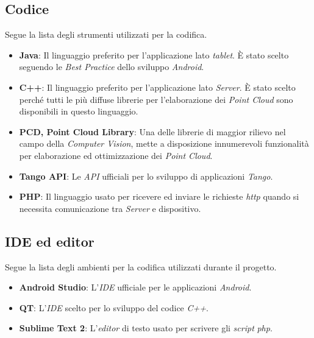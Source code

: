 \subsection{Codice}
Segue la lista degli strumenti utilizzati per la codifica.
\begin{itemize}
	\item \textbf{Java}: Il linguaggio preferito per l'applicazione lato \emph{tablet}. È stato scelto seguendo le \emph{Best Practice} dello sviluppo \emph{Android}.
	\item \textbf{C++}: Il linguaggio preferito per l'applicazione lato \emph{Server}. È stato scelto perché tutti le più diffuse librerie per l'elaborazione dei \emph{Point Cloud} sono disponibili in questo linguaggio.
	\item \textbf{PCD, Point Cloud Library}: Una delle librerie di maggior rilievo nel campo della \emph{Computer Vision}, mette a disposizione innumerevoli funzionalità per elaborazione ed ottimizzazione dei \emph{Point Cloud}.
	\item \textbf{Tango API}: Le \emph{API} ufficiali per lo sviluppo di applicazioni \emph{Tango}.
	\item \textbf{PHP}: Il linguaggio usato per ricevere ed inviare le richieste \emph{http} quando si necessita comunicazione tra \emph{Server} e dispositivo.
\end{itemize}

\subsection{IDE ed editor}
Segue la lista degli ambienti per la codifica utilizzati durante il progetto.
\begin{itemize}
	\item \textbf{Android Studio}: L'\emph{IDE} ufficiale per le applicazioni \emph{Android}.
	\item \textbf{QT}: L'\emph{IDE} scelto per lo sviluppo del codice \emph{C++}.
	\item \textbf{Sublime Text 2}: L'\emph{editor} di testo usato per scrivere gli \emph{script} \emph{php}.
\end{itemize}

